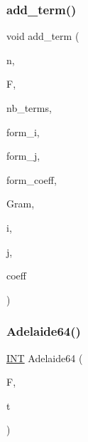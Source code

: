 \subsubsection{\texorpdfstring{add\+\_\+term()}{add\_term()}}
{\footnotesize\ttfamily void add\+\_\+term (\begin{DoxyParamCaption}\item[{\mbox{\hyperlink{galois_8h_a09fddde158a3a20bd2dcadb609de11dc}{I\+NT}}}]{n,  }\item[{\mbox{\hyperlink{classfinite__field}{finite\+\_\+field}} \&}]{F,  }\item[{\mbox{\hyperlink{galois_8h_a09fddde158a3a20bd2dcadb609de11dc}{I\+NT}} \&}]{nb\+\_\+terms,  }\item[{\mbox{\hyperlink{galois_8h_a09fddde158a3a20bd2dcadb609de11dc}{I\+NT}} $\ast$}]{form\+\_\+i,  }\item[{\mbox{\hyperlink{galois_8h_a09fddde158a3a20bd2dcadb609de11dc}{I\+NT}} $\ast$}]{form\+\_\+j,  }\item[{\mbox{\hyperlink{galois_8h_a09fddde158a3a20bd2dcadb609de11dc}{I\+NT}} $\ast$}]{form\+\_\+coeff,  }\item[{\mbox{\hyperlink{galois_8h_a09fddde158a3a20bd2dcadb609de11dc}{I\+NT}} $\ast$}]{Gram,  }\item[{\mbox{\hyperlink{galois_8h_a09fddde158a3a20bd2dcadb609de11dc}{I\+NT}}}]{i,  }\item[{\mbox{\hyperlink{galois_8h_a09fddde158a3a20bd2dcadb609de11dc}{I\+NT}}}]{j,  }\item[{\mbox{\hyperlink{galois_8h_a09fddde158a3a20bd2dcadb609de11dc}{I\+NT}}}]{coeff }\end{DoxyParamCaption})}

\mbox{\label{data_8_c_a8023439df602275a5ac0e2b51eb61523}} 
\subsubsection{\texorpdfstring{Adelaide64()}{Adelaide64()}}
{\footnotesize\ttfamily \mbox{\hyperlink{galois_8h_a09fddde158a3a20bd2dcadb609de11dc}{I\+NT}} Adelaide64 (\begin{DoxyParamCaption}\item[{\mbox{\hyperlink{classfinite__field}{finite\+\_\+field}} $\ast$}]{F,  }\item[{\mbox{\hyperlink{galois_8h_a09fddde158a3a20bd2dcadb609de11dc}{I\+NT}}}]{t }\end{DoxyParamCaption})}

